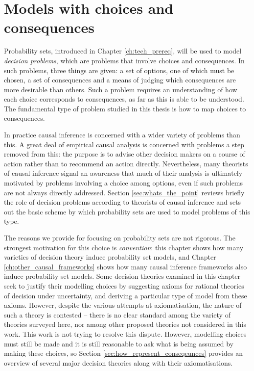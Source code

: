 

\chapter{Models with choices and consequences}\label{ch:2p_statmodels}

Probability sets, introduced in Chapter \ref{ch:tech_prereq}, will be used to model \emph{decision problems}, which are problems that involve choices and consequences. In such problems, three things are given: a set of options, one of which must be chosen, a set of consequences and a means of judging which consequences are more desirable than others. Such a problem requires an understanding of how each choice corresponds to consequences, as far as this is able to be understood. The fundamental type of problem studied in this thesis is how to map choices to consequences. 

In practice causal inference is concerned with a wider variety of problems than this. A great deal of empirical causal analysis is concerned with problems a step removed from this: the purpose is to advise other decision makers on a course of action rather than to recommend an action directly. Nevertheless, many theorists of causal inference signal an awareness that much of their analysis is ultimately motivated by problems involving a choice among options, even if such problems are not always directly addressed. Section \ref{sec:whats_the_point} reviews briefly the role of decision problems according to theorists of causal inference and sets out the basic scheme by which probability sets are used to model problems of this type.

The reasons we provide for focusing on probability sets are not rigorous. The strongest motivation for this choice is \emph{convention}: this chapter shows how many varieties of decision theory induce probability set models, and Chapter \ref{ch:other_causal_frameworks} shows how many causal inference frameworks also induce probability set models. Some decision theories examined in this chapter seek to justify their modelling choices by suggesting axioms for rational theories of decision under uncertainty, and deriving a particular type of model from these axioms. However, despite the various attempts at axiomatisation, the nature of such a theory is contested -- there is no clear standard among the variety of theories surveyed here, nor among other proposed theories not considered in this work. This work is not trying to resolve this dispute. However, modelling choices must still be made and it is still reasonable to ask what is being assumed by making these choices, so Section \ref{sec:how_represent_conseqeunces} provides an overview of several major decision theories along with their axiomatisations.

